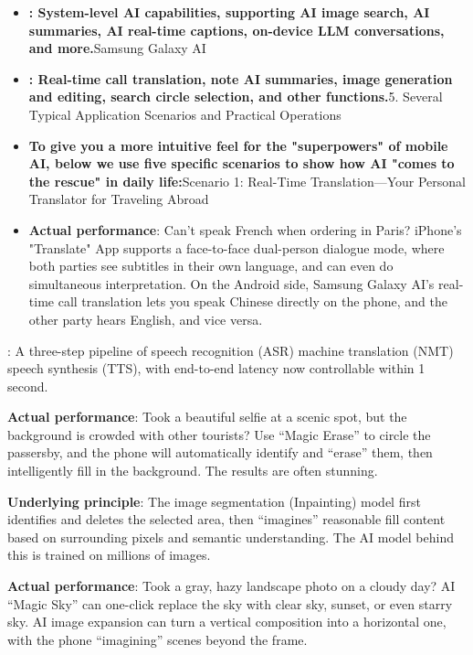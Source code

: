 \begin{itemize}
  \item \textbf{: System-level AI capabilities, supporting AI image search, AI summaries, AI real-time captions, on-device LLM conversations, and more.}Samsung Galaxy AI
  \item \textbf{: Real-time call translation, note AI summaries, image generation and editing, search circle selection, and other functions.}5. Several Typical Application Scenarios and Practical Operations
  \item \textbf{To give you a more intuitive feel for the "superpowers" of mobile AI, below we use five specific scenarios to show how AI "comes to the rescue" in daily life:}Scenario 1: Real-Time Translation—Your Personal Translator for Traveling Abroad
  \item \textbf{Actual performance}: Can't speak French when ordering in Paris? iPhone's "Translate" App supports a face-to-face dual-person dialogue mode, where both parties see subtitles in their own language, and can even do simultaneous interpretation. On the Android side, Samsung Galaxy AI's real-time call translation lets you speak Chinese directly on the phone, and the other party hears English, and vice versa.
\end{itemize}


: A three-step pipeline of speech recognition (ASR) machine translation (NMT) speech synthesis (TTS), with end-to-end latency now controllable within 1 second.


\textbf{Actual performance}: Took a beautiful selfie at a scenic spot, but the background is crowded with other tourists? Use “Magic Erase” to circle the passersby, and the phone will automatically identify and “erase” them, then intelligently fill in the background. The results are often stunning.

\textbf{Underlying principle}: The image segmentation (Inpainting) model first identifies and deletes the selected area, then “imagines” reasonable fill content based on surrounding pixels and semantic understanding. The AI model behind this is trained on millions of images.


\textbf{Actual performance}: Took a gray, hazy landscape photo on a cloudy day? AI “Magic Sky” can one-click replace the sky with clear sky, sunset, or even starry sky. AI image expansion can turn a vertical composition into a horizontal one, with the phone “imagining” scenes beyond the frame.

